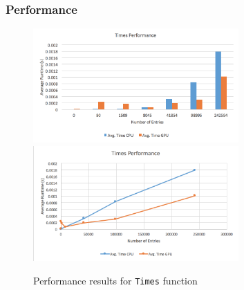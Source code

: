 \documentclass[12pt]{article}
\begin{document}
	\subsubsection{Performance}
    	\begin{figure}[h]
    	\centering
    	\caption{Performance results for \texttt{Times} function}\label{figPerformanceTimes}
    	\includegraphics[width=0.7\textwidth]{times_bar.png}
    	\includegraphics[width=0.7\textwidth]{times_line.png}
    	\end{figure}
\end{document}

